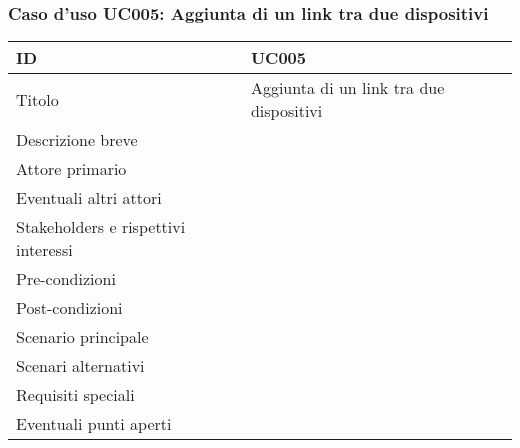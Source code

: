\documentclass[../../main.tex]{subfiles}
\begin{document}
\subsubsection{Caso d’uso UC005: Aggiunta di un link tra due dispositivi }
\begin{tabularx}{150mm}{|l|X|}
    \hline
    ID                                  & \textbf{UC005}\\
    \hline
    Titolo                              & Aggiunta di un link tra due dispositivi \\
    \hline
    Descrizione breve                   &    \\
    \hline
    Attore primario                     &    \\
    \hline
    Eventuali altri attori              &    \\
    \hline
    Stakeholders e rispettivi interessi &    \\
    \hline
    Pre-condizioni                      &    \\
    \hline
    Post-condizioni                     &    \\
    \hline
    Scenario principale                 &    \\
    \hline
    Scenari alternativi                 &    \\
    \hline
    Requisiti speciali                  &    \\
    \hline
    Eventuali punti aperti              &    \\
    \hline
\end{tabularx}
\newpage
\end{document}
